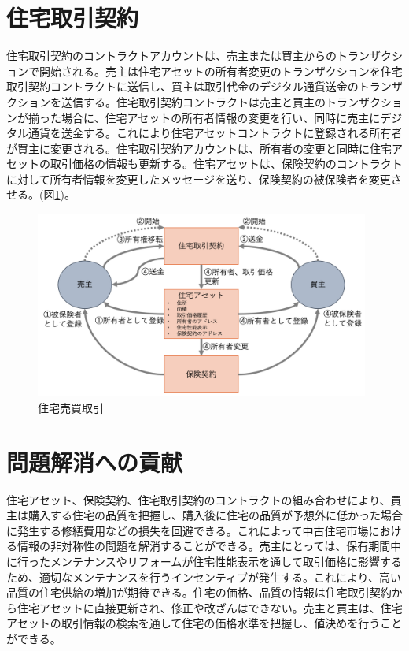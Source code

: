 \documentclass[a4paper,fontsize=11pt,report,notitlepage,line_length=38zw,number_of_lines=40,dvipdfmx]{jlreq}
\begin{document}
\section{住宅取引契約}
住宅取引契約のコントラクトアカウントは、売主または買主からのトランザクションで開始される。売主は住宅アセットの所有者変更のトランザクションを住宅取引契約コントラクトに送信し、買主は取引代金のデジタル通貨送金のトランザクションを送信する。住宅取引契約コントラクトは売主と買主のトランザクションが揃った場合に、住宅アセットの所有者情報の変更を行い、同時に売主にデジタル通貨を送金する。これにより住宅アセットコントラクトに登録される所有者が買主に変更される。住宅取引契約アカウントは、所有者の変更と同時に住宅アセットの取引価格の情報も更新する。住宅アセットは、保険契約のコントラクトに対して所有者情報を変更したメッセージを送り、保険契約の被保険者を変更させる。(図\ref{spa})。

\begin{figure}
 \centering
 \includegraphics[width=11cm]{spa.png}
 \caption{住宅売買取引}
 \label{spa}
\end{figure}

\section{問題解消への貢献}
住宅アセット、保険契約、住宅取引契約のコントラクトの組み合わせにより、買主は購入する住宅の品質を把握し、購入後に住宅の品質が予想外に低かった場合に発生する修繕費用などの損失を回避できる。これによって中古住宅市場における情報の非対称性の問題を解消することができる。売主にとっては、保有期間中に行ったメンテナンスやリフォームが住宅性能表示を通して取引価格に影響するため、適切なメンテナンスを行うインセンティブが発生する。これにより、高い品質の住宅供給の増加が期待できる。住宅の価格、品質の情報は住宅取引契約から住宅アセットに直接更新され、修正や改ざんはできない。売主と買主は、住宅アセットの取引情報の検索を通して住宅の価格水準を把握し、値決めを行うことができる。
\end{document}
